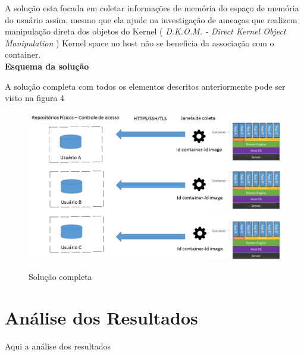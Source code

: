 \documentclass[
	12pt,				%
	openright,			%
	oneside,			%
	a4paper,			%
	english,			%
	brazil,				%
	]{abntex2}
\begin{document}
A solução esta focada em coletar informações de memória do espaço de memória do usuário assim, mesmo que ela ajude na investigação de ameaças que realizem manipulação direta
dos objetos do Kernel ( \textit{D.K.O.M. - Direct Kernel Object Manipulation} ) Kernel space no host não se beneficia da associação com o container.\\

\textbf{Esquema da solução}

A solução completa com todos os elementos descritos anteriormente pode ser visto na figura 4

\begin{figure}[h]
\caption{Solução completa}
\includegraphics[scale=0.5]{solucao.jpg}
\centering
\label{fig:Solucao}
\end{figure}

\chapter{Análise dos Resultados}

Aqui a análise dos resultados \cite{NIST2011}


\postextual





\printindex
\end{document}
